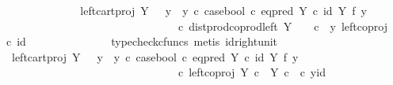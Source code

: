 \begin{isabellebody}
\ \ \ \ \ \ \ \ \ \ \isamarkupfalse%
\ \isamarkupfalse%
\ {\isachardoublequoteopen}{\isachardot}{\kern0pt}{\isachardot}{\kern0pt}{\isachardot}{\kern0pt}\ {\isacharequal}{\kern0pt}\ {\isacharparenleft}{\kern0pt}left{\isacharunderscore}{\kern0pt}cart{\isacharunderscore}{\kern0pt}proj\ Y\ {\isasymone}\ {\isasymamalg}\ {\isacharparenleft}{\kern0pt}{\isacharparenleft}{\kern0pt}y{}\ {\isasymamalg}\ y{}{\isacharparenright}{\kern0pt}\ {\isasymcirc}\isactrlsub c\ case{\isacharunderscore}{\kern0pt}bool\ {\isasymcirc}\isactrlsub c\ eq{\isacharunderscore}{\kern0pt}pred\ Y\ {\isasymcirc}\isactrlsub c\ {\isacharparenleft}{\kern0pt}id\ Y\ {\isasymtimes}\isactrlsub f\ y{}{\isacharparenright}{\kern0pt}{\isacharparenright}{\kern0pt}{\isacharparenright}{\kern0pt}\ \isanewline
\ \ \ \ \ \ \ \ \ \ \ \ \ \ \ \ \ \ \ \ \ \ \ \ \ \ \ \ \ \ \ \ \ {\isasymcirc}\isactrlsub c\ dist{\isacharunderscore}{\kern0pt}prod{\isacharunderscore}{\kern0pt}coprod{\isacharunderscore}{\kern0pt}left\ Y\ {\isasymone}\ {\isasymone}\ \ {\isasymcirc}\isactrlsub c\ \ {\isasymlangle}y{\isacharcomma}{\kern0pt}\ left{\isacharunderscore}{\kern0pt}coproj\ {\isasymone}\ {\isasymone}\ {\isasymcirc}\isactrlsub c\ id\ {\isasymone}{\isasymrangle}{\isachardoublequoteclose}\isanewline
\ \ \ \ \ \ \ \ \ \ \ \ \isamarkupfalse%
\ {\isacharparenleft}{\kern0pt}typecheck{\isacharunderscore}{\kern0pt}cfuncs{\isacharcomma}{\kern0pt}\ metis\ id{\isacharunderscore}{\kern0pt}right{\isacharunderscore}{\kern0pt}unit{}{\isacharparenright}{\kern0pt}\isanewline
\ \ \ \ \ \ \ \ \ \ \isamarkupfalse%
\ \isamarkupfalse%
\ {\isachardoublequoteopen}{\isachardot}{\kern0pt}{\isachardot}{\kern0pt}{\isachardot}{\kern0pt}\ {\isacharequal}{\kern0pt}\ {\isacharparenleft}{\kern0pt}left{\isacharunderscore}{\kern0pt}cart{\isacharunderscore}{\kern0pt}proj\ Y\ {\isasymone}\ {\isasymamalg}\ {\isacharparenleft}{\kern0pt}{\isacharparenleft}{\kern0pt}y{}\ {\isasymamalg}\ y{}{\isacharparenright}{\kern0pt}\ {\isasymcirc}\isactrlsub c\ case{\isacharunderscore}{\kern0pt}bool\ {\isasymcirc}\isactrlsub c\ eq{\isacharunderscore}{\kern0pt}pred\ Y\ {\isasymcirc}\isactrlsub c\ {\isacharparenleft}{\kern0pt}id\ Y\ {\isasymtimes}\isactrlsub f\ y{}{\isacharparenright}{\kern0pt}{\isacharparenright}{\kern0pt}{\isacharparenright}{\kern0pt}\ \isanewline
\ \ \ \ \ \ \ \ \ \ \ \ \ \ \ \ \ \ \ \ \ \ \ \ \ \ \ \ \ \ \ \ \ {\isasymcirc}\isactrlsub c\ left{\isacharunderscore}{\kern0pt}coproj\ {\isacharparenleft}{\kern0pt}Y\ {\isasymtimes}\isactrlsub c\ {\isasymone}{\isacharparenright}{\kern0pt}\ {\isacharparenleft}{\kern0pt}Y\ {\isasymtimes}\isactrlsub c\ {\isasymone}{\isacharparenright}{\kern0pt}\ {\isasymcirc}\isactrlsub c\ {\isasymlangle}y{\isacharcomma}{\kern0pt}id\ {\isasymone}{\isasymrangle}{\isachardoublequoteclose}\isanewline

\end{isabellebody}
